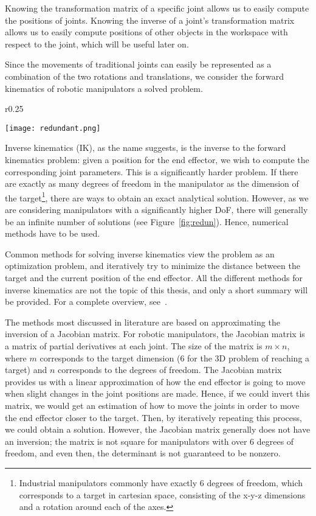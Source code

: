 Knowing the transformation matrix of a specific joint allows us to easily compute the positions of joints. Knowing the inverse of a joint's transformation matrix allows us to easily compute positions of other objects in the workspace with respect to the joint, which will be useful later on.

Since the movements of traditional joints can easily be represented as a combination of the two rotations and translations, we consider the forward kinematics of robotic manipulators a solved problem.


\begin{wrapfigure}{r}{0.25\textwidth}
    \centering
    \begin{minipage}{.25\textwidth}
        \texttt{[image: redundant.png]}
    \end{minipage}
    \caption{\\3 example IK solutions to the same problem~\cite{Ondika2021thesis}}\label{fig:redun}
\end{wrapfigure}

Inverse kinematics (IK), as the name suggests, is the inverse to the forward kinematics problem: given a position for the end effector, we wish to compute the corresponding joint parameters. This is a significantly harder problem. If there are exactly as many degrees of freedom in the manipulator as the dimension of the target\footnote{Industrial manipulators commonly have exactly 6 degrees of freedom, which corresponds to a target in cartesian space, consisting of the x-y-z dimensions and a rotation around each of the axes.}, there are ways to obtain an exact analytical solution. However, as we are considering manipulators with a significantly higher DoF, there will generally be an infinite number of solutions (see Figure~\ref{fig:redun}). Hence, numerical methods have to be used.

Common methods for solving inverse kinematics view the problem as an optimization problem, and iteratively try to minimize the distance between the target and the current position of the end effector. All the different methods for inverse kinematics are not the topic of this thesis, and only a short summary will be provided. For a complete overview, see~\cite{overview}.

The methods most discussed in literature are based on approximating the inversion of a Jacobian matrix. For robotic manipulators, the Jacobian matrix is a matrix of partial derivatives at each joint. The size of the matrix is $m \times n$, where $m$ corresponds to the target dimension (6 for the 3D problem of reaching a target) and $n$ corresponds to the degrees of freedom.
The Jacobian matrix provides us with a linear approximation of how the end effector is going to move when slight changes in the joint positions are made. Hence, if we could invert this matrix, we would get an estimation of how to move the joints in order to move the end effector closer to the target. Then, by iteratively repeating this process, we could obtain a solution. However, the Jacobian matrix generally does not have an inversion; the matrix is not square for manipulators with over 6 degrees of freedom, and even then, the determinant is not guaranteed to be nonzero.

